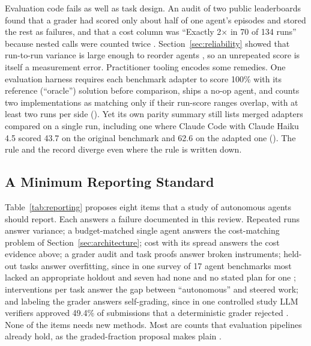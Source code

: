 Evaluation code fails as well as task design. An audit of two public leaderboards found that a grader had scored only about half of one agent's episodes and stored the rest as failures, and that a cost column was ``Exactly 2$\times$ in 70 of 134 runs'' because nested calls were counted twice \citep{F12}. Section~\ref{sec:reliability} showed that run-to-run variance is large enough to reorder agents \citep{F19,F24}, so an unrepeated score is itself a measurement error. Practitioner tooling encodes some remedies. One evaluation harness requires each benchmark adapter to score 100\% with its reference (``oracle'') solution before comparison, ships a no-op agent, and counts two implementations as matching only if their run-score ranges overlap, with at least two runs per side (). Yet its own parity summary still lists merged adapters compared on a single run, including one where Claude Code with Claude Haiku 4.5 scored 43.7 on the original benchmark and 62.6 on the adapted one (). The rule and the record diverge even where the rule is written down.

\subsection{A Minimum Reporting Standard}

Table~\ref{tab:reporting} proposes eight items that a study of autonomous agents should report. Each answers a failure documented in this review. Repeated runs answer variance; a budget-matched single agent answers the cost-matching problem of Section~\ref{sec:architecture}; cost with its spread answers the cost evidence above; a grader audit and task proofs answer broken instruments; held-out tasks answer overfitting, since in one survey of 17 agent benchmarks most lacked an appropriate holdout and seven had none and no stated plan for one \citep{A10}; interventions per task answer the gap between ``autonomous'' and steered work; and labeling the grader answers self-grading, since in one controlled study LLM verifiers approved 49.4\% of submissions that a deterministic grader rejected \citep{T18}. None of the items needs new methods. Most are counts that evaluation pipelines already hold, as the graded-fraction proposal makes plain \citep{F12}.

